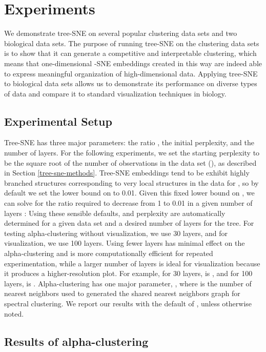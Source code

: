 \documentclass{article}
\begin{document}
\section{Experiments}

We demonstrate tree-SNE on several popular clustering data sets and two biological data sets. The purpose of running tree-SNE on the clustering data sets is to show that it can generate a competitive and interpretable clustering, which means that one-dimensional -SNE embeddings created in this way are indeed able to express meaningful organization of high-dimensional data. Applying tree-SNE to biological data sets allows us to demonstrate its performance on diverse types of data and compare it to standard visualization techniques in biology. 

\subsection{Experimental Setup}

Tree-SNE has three major parameters: the ratio , the initial perplexity, and the number of layers. For the following experiments, we set the starting perplexity to be the square root of the number of observations in the data set (), as described in Section \ref{tree-sne-methods}. Tree-SNE embeddings tend to be exhibit highly  branched structures corresponding to very local structures in the data for , so by default we set the lower bound on  to 0.01. Given this fixed lower bound on , we can solve for the ratio  required to decrease  from 1 to 0.01 in a given number of layers : 
Using these sensible defaults,  and perplexity are automatically determined for a given data set and a desired number of layers for the tree. For testing alpha-clustering without visualization, we use 30 layers, and for visualization, we use 100 layers. Using fewer layers has minimal effect on the alpha-clustering and is more computationally efficient for repeated experimentation, while a larger number of layers is ideal for visualization because it produces a higher-resolution plot. For example, for 30 layers,  is , and for 100 layers,  is . Alpha-clustering has one major parameter, , where  is the number of nearest neighbors used to generated the shared nearest neighbors graph for spectral clustering. We report our results with the default of , unless otherwise noted.

\subsection{Results of alpha-clustering}
\end{document}
